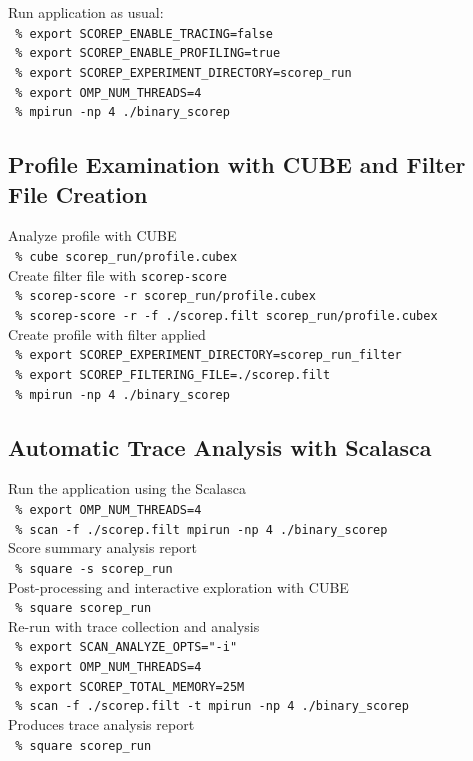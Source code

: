 \setlength{\topskip}{3em}
Run application as usual:\\
\texttt{ \% export SCOREP\_ENABLE\_TRACING=false}\\
\texttt{ \% export SCOREP\_ENABLE\_PROFILING=true}\\
\texttt{ \% export SCOREP\_EXPERIMENT\_DIRECTORY=scorep\_run}\\
\texttt{ \% export OMP\_NUM\_THREADS=4}\\
\texttt{ \% mpirun -np 4 ./binary\_scorep}\\

\vspace{1em}

\subsection{Profile Examination with CUBE and Filter File Creation}
Analyze profile with CUBE\\
\texttt{ \% cube scorep\_run/profile.cubex}\\
Create filter file with \texttt{scorep-score}\\
\texttt{ \% scorep-score -r scorep\_run/profile.cubex}\\
\texttt{ \% scorep-score -r -f ./scorep.filt scorep\_run/profile.cubex}\\
Create profile with filter applied\\
\texttt{ \% export SCOREP\_EXPERIMENT\_DIRECTORY=scorep\_run\_filter}\\
\texttt{ \% export SCOREP\_FILTERING\_FILE=./scorep.filt}\\
\texttt{ \% mpirun -np 4 ./binary\_scorep}\\


\subsection{Automatic Trace Analysis with Scalasca}
Run the application using the Scalasca\\
\texttt{ \% export OMP\_NUM\_THREADS=4}\\
\texttt{ \% scan -f ./scorep.filt  mpirun -np 4 ./binary\_scorep}\\
Score summary analysis report\\
\texttt{ \% square -s scorep\_run}\\
Post-processing and interactive exploration with CUBE\\
\texttt{ \% square scorep\_run}\\
Re-run with trace collection and analysis\\
\texttt{ \% export SCAN\_ANALYZE\_OPTS="-i"}\\
\texttt{ \% export OMP\_NUM\_THREADS=4}\\
\texttt{ \% export SCOREP\_TOTAL\_MEMORY=25M}\\
\texttt{ \% scan -f ./scorep.filt -t mpirun -np 4 ./binary\_scorep}\\
Produces trace analysis report\\
\texttt{ \% square scorep\_run}\\

